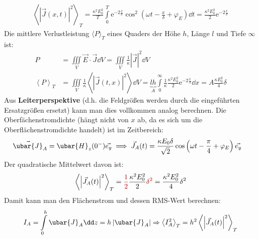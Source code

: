 			        \begin{equation}\begin{split}\left\langle \left| \vec{J}(x,t) \right|^2  \right\rangle_T  = \frac{\kappa^2E_0^2}{T} \int\limits_0^T  \mathrm{e}^{-2\frac{x}{\delta}} \cos^2\left(\omega t -\frac{x}{\delta} +\varphi_E \right) \dd t = \frac{\kappa^2E_0^2}{2}  \mathrm{e}^{-2\frac{x}{\delta}}
				        \end{split}\end{equation}
			   Die mittlere Verlustleistung $\langle P\rangle_T$ eines Quaders der Höhe $h$, Länge $l$ und Tiefe $\infty$ ist:
			        \begin{equation}\label{verlust1}\begin{split}
					        P &= \iiint\limits_V \vec{E}\cdot\vec{J}\dd V = \iiint\limits_V \frac{1}{\kappa}\left|\vec{J}\right|^2\dd V\\
					        \left\langle P\right\rangle_T &=\iiint\limits_V \frac{1}{\kappa}\left\langle\left|\vec{J}(t,x)\right|^2\right\rangle\dd V = \underbrace{l h}_{A}\int\limits_0^\infty \frac{1}{\kappa}\frac{\kappa^2E_0^2}{2}  \mathrm{e}^{-2\frac{x}{\delta}}\dd x = A  \frac{\kappa E_0^2}{4} \delta
				        \end{split}\end{equation}
Aus \textbf{Leiterperspektive} (d.h. die Feldgrößen werden durch die eingeführten Ersatzgrößen ersetzt) kann man dies vollkommen analog berechnen. Die Oberfächenstromdichte (hängt nicht von $x$ ab, da es sich um die Oberflächenstromdichte handelt) ist im Zeitbereich:
			        \begin{align}
				        \vec{\ubar{J}}_A & =\ubar{H}_z(0^-) \vec{e_y} \implies   \vec{J}_A(t)  = \frac{\kappa E_0 \delta}{\sqrt{2}}  \cos\left( \omega t -\frac{\pi}{4} +\varphi_E \right) \vec{e_y}
			        \end{align}
			   Der quadratische Mittelwert davon ist:
			        \begin{equation}\begin{split}\left\langle \left| \vec{J}_A(t) \right|^2  \right\rangle_T  = \textcolor{red}{\frac{1}{2}} \frac{\kappa^2E_0^2}{2} \textcolor{red}{\delta^2} = \frac{\kappa^2E_0^2}{4} \delta^2
				        \end{split}\end{equation}
			   Damit kann man den Flächenstrom und dessen RMS-Wert berechnen:
			        \begin{equation}\begin{split}
					        I_A=\int\limits_0^h \ubar{J}_A  \dd z = h \left|\ubar{J}_A\right| \Rightarrow \left\langle I_A^2 \right\rangle_T = h^2 \left\langle \left| \vec{J}_A(t) \right|^2  \right\rangle_T
				        \end{split}\end{equation}
